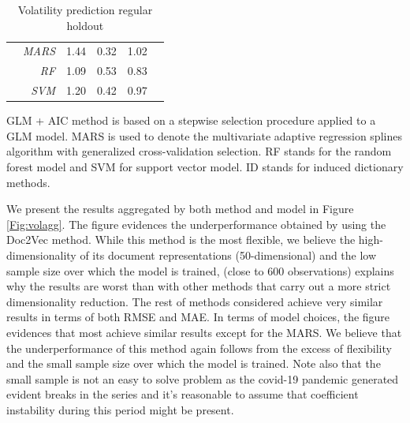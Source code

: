 \documentclass[a4paper, 12pt]{report}
\begin{document}
\begin{table}[H]
\begin{threeparttable}
\begin{tabular}{rrrrrrrrr}
      & \textit{MARS} & 1.44 & 0.32 & 1.02 & \multicolumn{4}{c}{} \\ 
      & \textit{RF} & 1.09 & 0.53 & 0.83 &  \multicolumn{4}{c}{}\\ 
      & \textit{SVM} & 1.20 & 0.42 & 0.97 & \multicolumn{4}{c}{}\\
       \bottomrule
    \end{tabular}
    \begin{tablenotes}
      \footnotesize
      \item GLM + AIC method is based on a stepwise selection procedure applied to a GLM model. MARS is used to denote the multivariate adaptive regression splines algorithm with generalized cross-validation selection. RF stands for the random forest model and SVM for support vector model. ID stands for induced dictionary methods.
    \end{tablenotes}
    \caption{Volatility prediction regular holdout}
    \label{Tab:Volatility}
  \end{threeparttable}
    \end{table}
    
    We present the results aggregated by both method and model in Figure \ref{Fig:volagg}. The figure evidences the underperformance obtained by using the Doc2Vec method. While this method is the most flexible, we believe the high-dimensionality of its document representations (50-dimensional) and the low sample size over which the model is trained, (close to $600$ observations) explains why the results are worst than with other methods that carry out a more strict dimensionality reduction. The rest of methods considered achieve very similar results in terms of both RMSE and MAE. In terms of model choices, the figure evidences that most achieve similar results except for the MARS. We believe that the underperformance of this method again follows from the excess of flexibility and the small sample size over which the model is trained. Note also that the small sample is not an easy to solve problem as the covid-19 pandemic generated evident breaks in the series and it's reasonable to assume that coefficient instability during this period might be present. 
    
\end{document}
